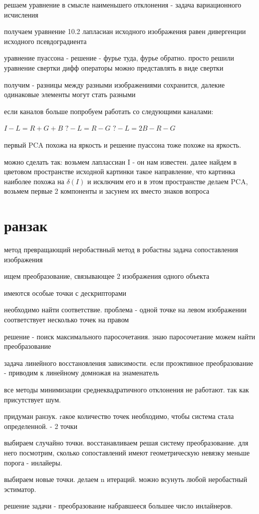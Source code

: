 \documentclass[]{report}
\begin{document}
решаем уравнение в смысле наименьшего отклонения - задача вариационного исчисления

получаем уравнение 10.2
лапласиан исходного изображения равен дивергенции исходного псевдоградиента

уравнение пуассона - решение - фурье туда, фурье обратно. просто решили уравнение свертки
дифф операторы можно представлять в виде свертки

получим - разницы между разными изображениями сохранится, далекие одинаковые элементы могут стать разными

если каналов больше попробуем работать со следующими каналами:

$I - L = R+G+B$
$? - L = R-G$
$? - L = 2B-R-G$

первый PCA похожа на яркость и решение пуассона тоже похоже на яркость.

можно сделать так:
возьмем лаплассиан I - он нам известен. далее найдем в цветовом пространстве исходной картинки такое направление, что картинка наиболее похожа на $\delta(I)$ и исключим его
и в этом пространстве делаем PCA, возьмем первые 2 компоненты и засунем их вместо знаков вопроса

\section{ранзак}

метод превращающий неробаствный метод в робастны
задача сопоставления изображения

ищем преобразование, связывающее 2 изображения одного объекта

имеются особые точки с дескрипторами

необходимо найти соответствие.
проблема - одной точке на левом изображении соответствует несколько точек на правом

решение - поиск максимального паросочетания.
знаю паросочетание можем найти преобразование

задача линейного восстановления зависимости.
если проэктивное преобразование - приводим к линейному домножая на знаменатель

все методы минимизации среднеквадратичного отклонения не работают. так как присутствует шум.

придуман ранзук. 
rакое количество точек необходимо, чтобы система стала определенной. - 2 точки 

выбираем случайно точки.
восстанавливаем решая систему преобразование. для него посмотрим, сколько сопоставлений имеют геометрическую невязку меньше порога - инлайеры.

выбираем новые точки.
делаем n итераций.
можно всунуть любой неробастный эстиматор.

решение задачи - преобразование набравшееся большее число инлайнеров.
\end{document}
